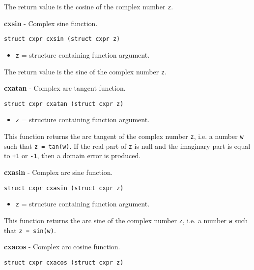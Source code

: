 \documentclass{article}
\begin{document}
The return value is the cosine of the complex number \texttt{z}.


\hrulefill{}

\textbf{cxsin} - Complex sine function.

\begin{verbatim}
struct cxpr cxsin (struct cxpr z)
\end{verbatim}

\begin{itemize}
\item \texttt{z} = structure containing function argument.
\end{itemize}

The return value is the sine of the complex number \texttt{z}.


\hrulefill{}

\textbf{cxatan} - Complex arc tangent function.

\begin{verbatim}
struct cxpr cxatan (struct cxpr z)
\end{verbatim}

\begin{itemize}
\item \texttt{z} = structure containing function argument.
\end{itemize}

This function returns the arc tangent of the complex 
number \texttt{z}, i.e. a number \texttt{w} such that
\texttt{z = tan(w)}.
If the real part of \texttt{z} is null and the
imaginary part is equal to \texttt{+1} or \texttt{-1},
then a domain error is produced.


\hrulefill{}

\textbf{cxasin} - Complex arc sine function.

\begin{verbatim}
struct cxpr cxasin (struct cxpr z)
\end{verbatim}

\begin{itemize}
\item \texttt{z} = structure containing function argument.
\end{itemize}

This function returns the arc sine of the complex 
number \texttt{z}, i.e. a number \texttt{w} such that
\texttt{z = sin(w)}.


\hrulefill{}

\textbf{cxacos} - Complex arc cosine function.

\begin{verbatim}
struct cxpr cxacos (struct cxpr z)
\end{verbatim}
\end{document}
